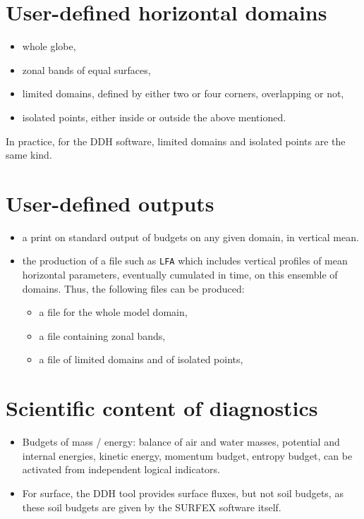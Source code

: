 \section{User-defined horizontal domains}

\begin{itemize}
	\item whole globe,
	\item zonal bands of equal surfaces,
	\item limited domains, defined by either two or four corners, overlapping or not,
	\item isolated points, either inside or outside the above mentioned.
\end{itemize}

In practice, for the DDH software, limited domains and isolated points are the same kind.
\section {User-defined outputs} 
\begin {itemize}
	\item a print on standard output of budgets on any given domain, in vertical mean.
	\item the production of a file such as {\tt LFA} which includes vertical profiles
	of mean horizontal parameters, eventually cumulated in time, on this
	ensemble of domains.
	Thus, the following files can be produced: 
	\begin{itemize}
		\item a file for the whole model domain,
		\item a file containing zonal bands,
		\item a file of limited domains and of isolated points,
	\end{itemize}
\end{itemize}

\section{Scientific content of diagnostics}
\begin{itemize}
	\item Budgets of mass / energy: balance of air and water masses, potential
	and internal energies, kinetic energy, momentum budget, entropy budget,
	can be activated from independent logical indicators.
	\item For surface, the DDH tool provides surface fluxes,
		but not soil budgets, as these soil budgets are given
		by the SURFEX software itself.
\end{itemize}

